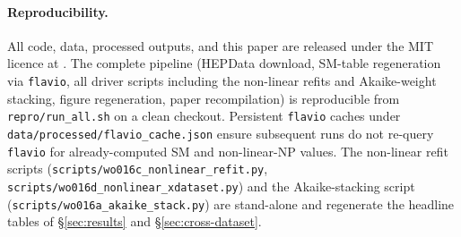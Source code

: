 \paragraph{Reproducibility.} All code, data, processed outputs, and
this paper are released under the MIT licence at
\citep{vfdBAnomalyRepo}. The complete pipeline (HEPData download,
SM-table regeneration via \texttt{flavio}, all driver scripts
including the non-linear refits and Akaike-weight stacking, figure
regeneration, paper recompilation) is reproducible from
\texttt{repro/run\_all.sh} on a clean checkout. Persistent
\texttt{flavio} caches under \texttt{data/processed/flavio\_cache.json}
ensure subsequent runs do not re-query \texttt{flavio} for already-computed
SM and non-linear-NP values. The non-linear refit scripts
(\texttt{scripts/wo016c\_nonlinear\_refit.py},
\texttt{scripts/wo016d\_nonlinear\_xdataset.py}) and the
Akaike-stacking script
(\texttt{scripts/wo016a\_akaike\_stack.py}) are stand-alone and
regenerate the headline tables of \S\ref{sec:results} and
\S\ref{sec:cross-dataset}.
